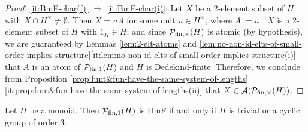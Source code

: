 \begin{proof}
	
	
	\ref{it:BmF-char(f)} $\Rightarrow$ \ref{it:BmF-char(i)}: Let $X$ be a $2$-element subset of $H$ with $X \cap H^\times \ne \emptyset$. Then $X = uA$ for some unit $u \in H^\times$, where $A := u^{-1}X$ is a $2$-element subset of $H$ with $1_H \in H$; and since $\mathcal P_{\textrm{fin},\times}(H)$ is atomic (by hypothesis), we are guaranteed by Lemmas \ref{lem:2-elt-atoms} and \ref{lem:no-non-id-elts-of-small-order-implies-structure}\ref{it:lem:no-non-id-elts-of-small-order-implies-structure(i)} that $A$ is an atom of $\mathcal P_{\textrm{fin}, 1}(H)$ and $H$ is Dedekind-finite. Therefore, we conclude from Proposition \ref{prop:funt&fun-have-the-same-system-of-lengths}\ref{it:prop:funt&fun-have-the-same-system-of-lengths(ii)} that $X \in \mathcal{A}(\mathcal P_{\textrm{fin}, \times}(H))$.
\end{proof}

\begin{thm}\label{prop:HF-exp-3}
	Let $H$ be a monoid. Then $\mathcal P_{\textrm{fin}, 1}(H)$ is \textup{HmF} if and only if $H$ is trivial or a cyclic group of order $3$.
%
\end{thm}

